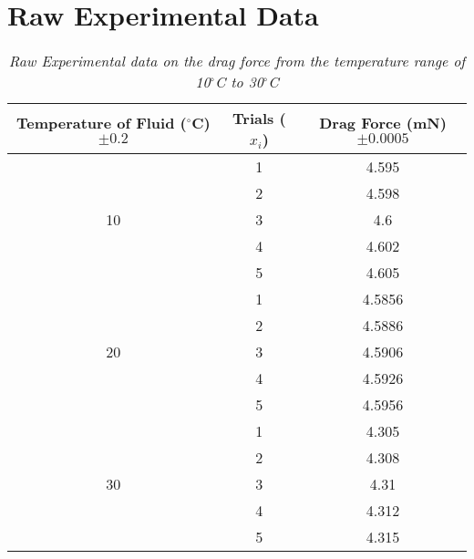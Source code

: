 \section{Raw Experimental Data}\label{rawexp mod1}

\begin{table}[htbp]
  \centering
  \caption{\textit{Raw Experimental data on the drag force from the temperature range of 10$^\circ$C to 30$^\circ$C}}
    \begin{tabular}{ccc}
    \toprule
    Temperature of Fluid ($^\circ$C) $\pm 0.2$ & Trials ($x_i$) & Drag Force (mN) $\pm 0.0005$ \\
    \midrule
    \multirow{5}[10]{*}{10} & 1     & 4.595 \\
\cmidrule{2-3}          & 2     & 4.598 \\
\cmidrule{2-3}          & 3     & 4.6 \\
\cmidrule{2-3}          & 4     & 4.602 \\
\cmidrule{2-3}          & 5     & 4.605 \\
    \midrule
    \multirow{5}[10]{*}{20} & 1     & 4.5856 \\
\cmidrule{2-3}          & 2     & 4.5886 \\
\cmidrule{2-3}          & 3     & 4.5906 \\
\cmidrule{2-3}          & 4     & 4.5926 \\
\cmidrule{2-3}          & 5     & 4.5956 \\
    \midrule
    \multirow{5}[10]{*}{30} & 1     & 4.305 \\
\cmidrule{2-3}          & 2     & 4.308 \\
\cmidrule{2-3}          & 3     & 4.31 \\
\cmidrule{2-3}          & 4     & 4.312 \\
\cmidrule{2-3}          & 5     & 4.315 \\
    \bottomrule
    \end{tabular}%
  \label{tab:addlabel}%
\end{table}%

